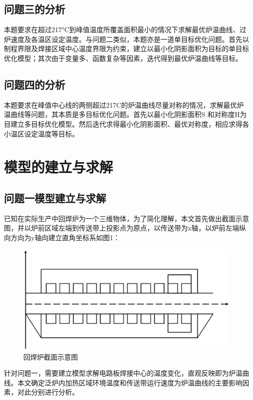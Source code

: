 \documentclass[a4paper,12pt]{ctexart} %
\begin{document}
	\subsection{问题三的分析}
	本题要求在超过217°C到峰值温度所覆盖面积最小的情况下求解最优炉温曲线、过炉速度及各温区设定温度。与问题二类似，本题亦是一道单目标优化问题。首先以制程界限及焊接区域中心温度界限为约束，建立以最小化阴影面积为目标的单目标优化模型；其次由于变量多、函数复杂等因素，迭代得到最优炉温曲线等目标。\par
	\subsection{问题四的分析}
	本题要求在峰值中心线的两侧超过217C的炉温曲线尽量对称的情况，求解最优炉温曲线等问题，其本质是多目标优化问题。首先以最小化阴影面积S 和对称度H为目建立多目标优化模型。然后迭代求得最小化阴影面积、最优对称度，相应求得各小温区设定温度等目标。\par
	
	\section{模型的建立与求解}
	
	\subsection{问题一模型建立与求解}
	已知在实际生产中回焊炉为一个三维物体\cite{ref1}，为了简化理解，本文首先做出截面示意图，并以炉前区域左端到传送带上投影点为原点，以传送带为x轴，以炉前左端纵向方向为y轴向建立直角坐标系如图1：\par
		\begin{figure}[H]
		\centering
		\includegraphics[scale=0.3]{Q1-1}
		\caption{回焊炉截面示意图}
	\end{figure}\par
	针对问题一，需要建立模型求解电路板焊接中心的温度变化，直观反映即为炉温曲线。本文确定泛炉内加热区域环境温度和传送带运行速度为炉温曲线的主要影响因素，对此分别进行分析。\par
\end{document}
